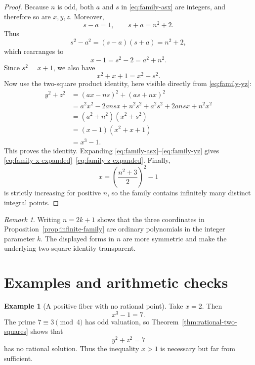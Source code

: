 \documentclass[11pt,a4paper]{article}
\numberwithin{equation}{section}
\theoremstyle{definition}
\newtheorem{example}[theorem]{Example}
\theoremstyle{remark}
\newtheorem{remark}[theorem]{Remark}
\begin{document}
\begin{proof}
Because $n$ is odd, both $a$ and $s$ in \eqref{eq:family-asx} are integers, and therefore so are $x,y,z$. Moreover,
\[
 s-a=1,
 \qquad
 s+a=n^2+2.
\]
Thus
\begin{equation}
 s^2-a^2=(s-a)(s+a)=n^2+2,
 \label{eq:s-a-identity}
\end{equation}
which rearranges to
\begin{equation}
 x-1=s^2-2=a^2+n^2.
 \label{eq:x-minus-one-squares}
\end{equation}
Since $s^2=x+1$, we also have
\begin{equation}
 x^2+x+1=x^2+s^2.
 \label{eq:quadratic-factor-squares}
\end{equation}
Now use the two-square product identity, here visible directly from \eqref{eq:family-yz}:
\begin{align*}
 y^2+z^2
 &=(ax-ns)^2+(as+nx)^2\\
 &=a^2x^2-2ansx+n^2s^2
   +a^2s^2+2ansx+n^2x^2\\
 &=(a^2+n^2)(x^2+s^2)\\
 &=(x-1)(x^2+x+1)\\
 &=x^3-1.
\end{align*}
This proves the identity. Expanding \eqref{eq:family-asx}--\eqref{eq:family-yz} gives \eqref{eq:family-x-expanded}--\eqref{eq:family-z-expanded}. Finally,
\[
 x=\left(\frac{n^2+3}{2}\right)^2-1
\]
is strictly increasing for positive $n$, so the family contains infinitely many distinct integral points.
\end{proof}

\begin{remark}
Writing $n=2k+1$ shows that the three coordinates in Proposition~\ref{prop:infinite-family} are ordinary polynomials in the integer parameter $k$. The displayed forms in $n$ are more symmetric and make the underlying two-square identity transparent.
\end{remark}

\section{Examples and arithmetic checks}

\begin{example}[A positive fiber with no rational point]
Take $x=2$. Then
\[
 x^3-1=7.
\]
The prime $7\equiv3\pmod4$ has odd valuation, so Theorem~\ref{thm:rational-two-squares} shows that
\[
 y^2+z^2=7
\]
has no rational solution. Thus the inequality $x>1$ is necessary but far from sufficient.
\end{example}
\end{document}
